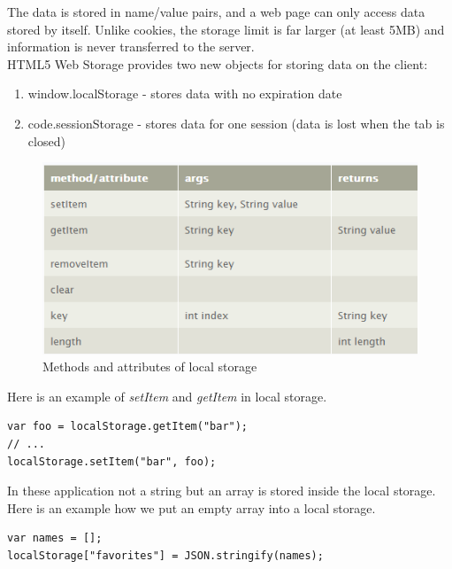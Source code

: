 The data is stored in name/value pairs, and a web page can only access data stored by itself. Unlike cookies, the storage limit is far larger (at least 5MB) and information is never transferred to the server.\cite{w3school}
\\

HTML5 Web Storage provides two new objects for storing data on the client:
\begin{enumerate}
\item window.localStorage - stores data with no expiration date\cite{w3school}
\item code.sessionStorage - stores data for one session (data is lost when the tab is closed)\cite{w3school}
\end{enumerate}


\begin{figure}[h]
\centering
\includegraphics[width=0.9\linewidth]{graphics/chapter4/20}
\caption{Methods and attributes of local storage\cite{localstorageapi}}
\end{figure}


Here is an example of \textit{setItem} and \textit{getItem} in local storage.
\\

\begin{lstlisting}[language=html, caption= 
setItem example (Adapted from \cite{localstorageexample}),captionpos=b]
var foo = localStorage.getItem("bar");
// ...
localStorage.setItem("bar", foo);
\end{lstlisting}

In these application not a string but an array is stored inside the local storage. Here is an example how we put an empty array into a local storage.
\\

\begin{lstlisting}[language=html, caption= 
array into local storage,captionpos=b]
var names = [];
localStorage["favorites"] = JSON.stringify(names);
\end{lstlisting}
\
\

